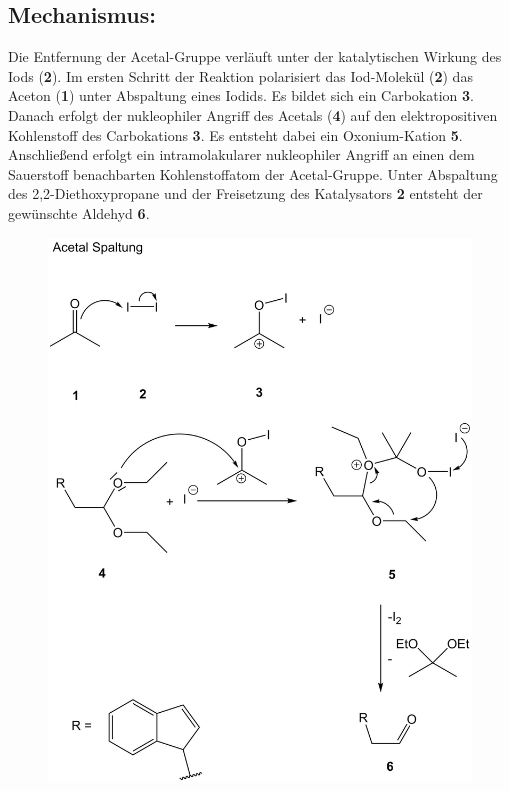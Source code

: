 \documentclass[12pt]{article}
\begin{document}
\begin{onehalfspace}
\section{Mechanismus\cite{bio}:}
Die Entfernung der Acetal-Gruppe verläuft unter der katalytischen Wirkung des Iods (\textbf{2}). 
Im ersten Schritt der Reaktion polarisiert das Iod-Molekül (\textbf{2}) das Aceton (\textbf{1}) unter Abspaltung eines Iodids. Es bildet sich ein Carbokation \textbf{3}. Danach erfolgt der nukleophiler Angriff des Acetals (\textbf{4}) auf den elektropositiven Kohlenstoff des Carbokations \textbf{3}. 
Es entsteht dabei ein Oxonium-Kation \textbf{5}. Anschließend erfolgt ein intramolakularer nukleophiler Angriff an einen dem Sauerstoff benachbarten Kohlenstoffatom der Acetal-Gruppe. Unter Abspaltung des 2,2-Diethoxypropane und der Freisetzung des Katalysators \textbf{2} entsteht der gewünschte Aldehyd \textbf{6}.
\noindent
\begin{figure}[!htbp]
\includegraphics[scale=0.25]{mechan.png}
\end{figure}


\end{onehalfspace}
\end{document}
